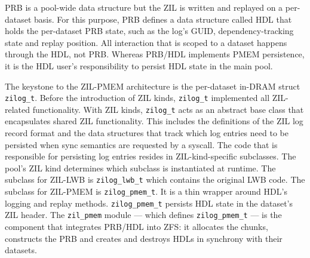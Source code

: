 \documentclass[12pt,a4paper,twoside]{book}
\begin{document}
PRB is a pool-wide data structure but the ZIL is written and replayed on a per-dataset basis.
For this purpose, PRB defines a data structure called HDL that holds the per-dataset PRB state, such as the log's GUID, dependency-tracking state and replay position.
All interaction that is scoped to a dataset happens through the HDL, not PRB.
Whereas PRB/HDL implements PMEM persistence, it is the HDL user's responsibility to persist HDL state in the main pool.

The keystone to the ZIL-PMEM architecture is the per-dataset in-DRAM struct \lstinline{zilog_t}.
Before the introduction of ZIL kinds, \lstinline{zilog_t} implemented all ZIL-related functionality.
With ZIL kinds, \lstinline{zilog_t} acts as an abstract base class that encapsulates shared ZIL functionality.
This includes the definitions of the ZIL log record format and the data structures that track which log entries need to be persisted when sync semantics are requested by a syscall.
The code that is responsible for persisting log entries resides in ZIL-kind-specific subclasses.
The pool's ZIL kind determines which subclass is instantiated at runtime.
The subclass for ZIL-LWB is \lstinline{zilog_lwb_t} which contains the original LWB code.
The subclass for ZIL-PMEM is \lstinline{zilog_pmem_t}.
It is a thin wrapper around HDL's logging and replay methods.
\lstinline{zilog_pmem_t} persists HDL state in the dataset's ZIL header.
The \lstinline{zil_pmem} module --- which defines \lstinline{zilog_pmem_t} --- is the component that integrates PRB/HDL into ZFS:
it allocates the chunks, constructs the PRB and creates and destroys HDLs in synchrony with their datasets.
\end{document}
